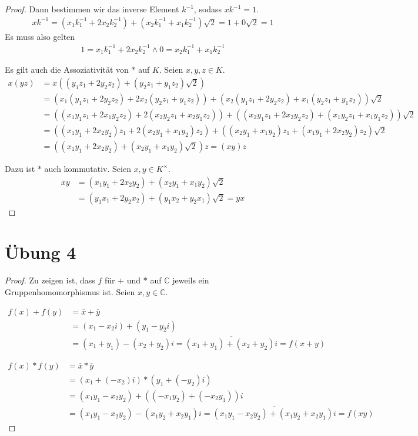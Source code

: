 \documentclass[a4paper,10pt]{article}
\begin{document}
\begin{proof}
 Dann bestimmen wir das inverse Element $k^{-1}$, sodass $xk^{-1} = 1$.
 \begin{align*}
  xk^{-1} = (x_1k^{-1}_1 + 2x_2k^{-1}_2) + (x_2k^{-1}_1 + x_1k^{-1}_2)\sqrt{2} = 1 + 0\sqrt{2} = 1
 \end{align*}
 Es muss also gelten
 \begin{align*}
  1 = x_1k^{-1}_1 + 2x_2k^{-1}_2 \land 0 = x_2k^{-1}_1 + x_1k^{-1}_2
 \end{align*}

 
 Es gilt auch die Assoziativität von $*$ auf $K$.
 Seien $x, y, z \in K$.
 \begin{align*}
  x(yz) & = x((y_1z_1 + 2y_2z_2) + (y_2z_1 + y_1z_2)\sqrt{2})\\
  & = (x_1(y_1z_1 + 2y_2z_2) + 2x_2(y_2z_1 + y_1z_2)) + (x_2(y_1z_1 + 2y_2z_2) + x_1(y_2z_1 + y_1z_2))\sqrt{2}\\
  & = ((x_1y_1z_1 + 2x_1y_2z_2) + 2(x_2y_2z_1 + x_2y_1z_2)) + ((x_2y_1z_1 + 2x_2y_2z_2) + (x_1y_2z_1 + x_1y_1z_2))\sqrt{2}\\
  & = ((x_1y_1 + 2x_2y_2)z_1 + 2(x_2y_1 + x_1y_2)z_2) + ((x_2y_1 + x_1y_2)z_1 + (x_1y_1 + 2x_2y_2)z_2)\sqrt{2}\\
  & = ((x_1y_1 + 2x_2y_2) + (x_2y_1 + x_1y_2)\sqrt{2})z = (xy)z
 \end{align*}
 
 Dazu ist $*$ auch kommutativ.
 Seien $x, y \in K^\times$.
 \begin{align*}
  xy & = (x_1y_1 + 2x_2y_2) + (x_2y_1 + x_1y_2)\sqrt{2}\\
  & = (y_1x_1 + 2y_2x_2) + (y_1x_2 + y_2x_1)\sqrt{2} = yx
 \end{align*}
\end{proof}

\section*{Übung 4}

\begin{proof}
 Zu zeigen ist, dass $f$ für $+$ und $*$ auf $\mathbb{C}$ jeweils ein Gruppenhomomorphismus ist.
 Seien $x, y \in \mathbb{C}$.
 
 \begin{align*}
  f(x) + f(y) & = \overline{x} + \overline{y}\\
  & = (x_1 - x_2i) + (y_1 - y_2i)\\
  & = (x_1 + y_1) - (x_2 + y_2)i = \overline{(x_1 + y_1) + (x_2 + y_2)i} = f(x + y)
 \end{align*}
 
 \begin{align*}
  f(x) * f(y) & = \overline{x} * \overline{y}\\
  & = (x_1 + (-x_2)i) * (y_1 + (-y_2)i)\\
  & = (x_1y_1 - x_2y_2) + ((-x_1y_2) + (-x_2y_1))i\\
  & = (x_1y_1 - x_2y_2) - (x_1y_2 + x_2y_1)i = \overline{(x_1y_1 - x_2y_2) + (x_1y_2 + x_2y_1)i} = f(xy)
 \end{align*}
\end{proof}
\end{document}
